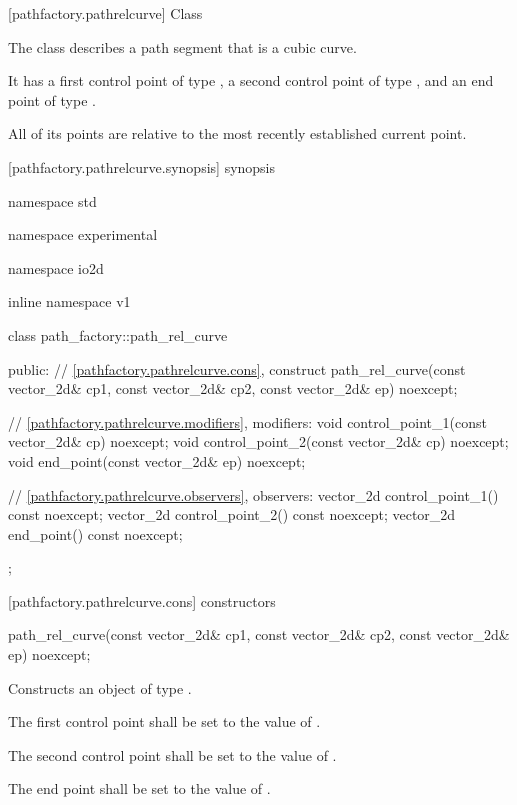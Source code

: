  [pathfactory.pathrelcurve] {Class }

\pnum
{}
The class  describes a path segment that is a cubic \bezierlocal curve.

\pnum
It has a first control point of type , a second control point of type , and an end point of type .

\pnum
All of its points are relative to the most recently established current point.

 [pathfactory.pathrelcurve.synopsis] { synopsis}

\begin{codeblock}
namespace std { namespace experimental { namespace io2d { inline namespace v1 {
  class path_factory::path_rel_curve {
  public:
    // \ref{pathfactory.pathrelcurve.cons}, construct
    path_rel_curve(const vector_2d& cp1, const vector_2d& cp2,
      const vector_2d& ep) noexcept;

    // \ref{pathfactory.pathrelcurve.modifiers}, modifiers:
    void control_point_1(const vector_2d& cp) noexcept;
    void control_point_2(const vector_2d& cp) noexcept;
    void end_point(const vector_2d& ep) noexcept;

    // \ref{pathfactory.pathrelcurve.observers}, observers:
    vector_2d control_point_1() const noexcept;
    vector_2d control_point_2() const noexcept;
    vector_2d end_point() const noexcept;
  };
} } } }
\end{codeblock}

 [pathfactory.pathrelcurve.cons] { constructors}
\begin{itemdecl}
    path_rel_curve(const vector_2d& cp1, const vector_2d& cp2,
      const vector_2d& ep) noexcept;
\end{itemdecl}
\begin{itemdescr}
	\pnum
	\effects
	Constructs an object of type .
	
	\pnum
	The first control point shall be set to the value of .
	
	\pnum
	The second control point shall be set to the value of .
	
	\pnum
	The end point shall be set to the value of .
\end{itemdescr}


